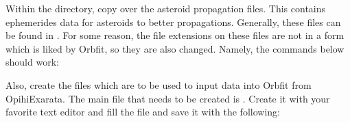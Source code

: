 \documentclass[letterpaper,11pt,english]{sphinxmanual}
\begin{document}
\sphinxAtStartPar
Within the  directory, copy over the asteroid propagation
files. This contains ephemerides data for asteroids to better propagations.
Generally, these files can be found in . For
some reason, the file extensions on these files are not in a form which is
liked by Orbfit, so they are also changed. Namely, the commands below should
work:

\begin{sphinxVerbatim}[commandchars=\\\{\}]
  
  
  
  
  
  
  
\end{sphinxVerbatim}

\sphinxAtStartPar
Also, create the files which are to be used to input data into Orbfit from
OpihiExarata. The main file that needs to be created is .
Create it with your favorite text editor and fill the file and save it with
the following:
\end{document}
